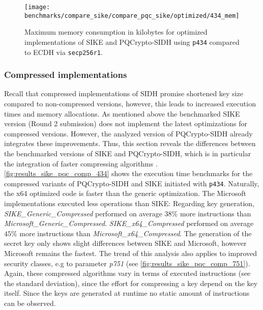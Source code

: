 \begin{figure}[H]
  \centering
  \texttt{[image: benchmarks/compare\_sike/compare\_pqc\_sike/optimized/434\_mem]}
  \caption[Maximum memory consumption for optimized implementations of \gls{SIKE} and \gls{PQCrypto-SIDH} using \texttt{p434}]
  {Maximum memory consumption in kilobytes for optimized implementations of \gls{SIKE} and \gls{PQCrypto-SIDH} using \texttt{p434} compared to \gls{ECDH} via \texttt{secp256r1}.}
  \label{fig:results_sike_pqc_opt_434_mem}
\end{figure}

\subsubsection{Compressed implementations}
Recall that compressed implementations of \gls{SIDH} promise shortened key size compared to non-compressed versions, however, this leads to increased execution times and memory allocations. As mentioned above the benchmarked \gls{SIKE} version (Round 2 submission) does not implement the latest optimizations for compressed versions. However, the analyzed version of \gls{PQCrypto-SIDH} already integrates these improvements. Thus, this section reveals the differences between the benchmarked versions of \gls{SIKE} and \gls{PQCrypto-SIDH}, which is in particular the integration of faster compressing algorithms \parencite{cryptoeprint:2020:431}.\\
\autoref{fig:results_sike_pqc_comp_434} shows the execution time benchmarks for the compressed variants of \gls{PQCrypto-SIDH} and \gls{SIKE} initiated with \texttt{p434}. Naturally, the x64 optimized code is faster than the generic optimization. The Microsoft implementations executed less operations than \gls{SIKE}: Regarding key generation, \textit{SIKE\_Generic\_Compressed} performed on average $38$\% more instructions than \textit{Microsoft\_Generic\_Compressed}. \textit{SIKE\_x64\_Compressed} performed on average $45$\% more instructions than \textit{Microsoft\_x64\_Compressed}. The generation of the secret key only shows slight differences between \gls{SIKE} and Microsoft, however Microsoft remains the fastest. The trend of this analysis also applies to improved security classes, e.g to parameter \textit{p751} (see \autoref{fig:results_sike_pqc_comp_751}). Again, these compressed algorithms vary in terms of executed instructions (see the standard deviation), since the effort for compressing a key depend on the key itself. Since the keys are generated at runtime no static amount of instructions can be observed.
